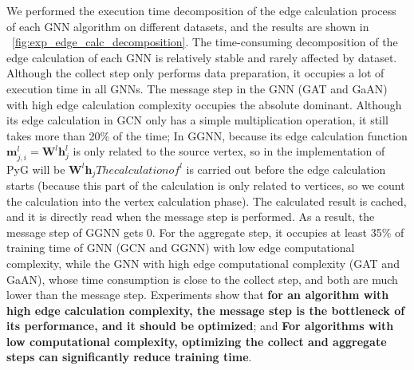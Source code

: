 We performed the execution time decomposition of the edge calculation process of each GNN algorithm on different datasets,
and the results are shown in \figurename~\ref{fig:exp_edge_calc_decomposition}.
The time-consuming decomposition of the edge calculation of each GNN is relatively stable and rarely affected by dataset.
Although the collect step only performs data preparation, it occupies a lot of execution time in all GNNs.
The message step in the GNN (GAT and GaAN) with high edge calculation complexity occupies the absolute dominant.
Although its edge calculation in GCN only has a simple multiplication operation, it still takes more than 20\% of the time;
In GGNN, because its edge calculation function $\boldsymbol{m}_{j,i }^l=\boldsymbol{W}^l\boldsymbol{h}_{j}^l$ is only related to the source vertex,
so in the implementation of PyG will be $\boldsymbol{W}^l\boldsymbol{h}_j The calculation of ^l$ is carried out before the edge calculation starts
(because this part of the calculation is only related to vertices, so we count the calculation into the vertex calculation phase).
The calculated result is cached, and it is directly read when the message step is performed. As a result, the message step of GGNN gets 0.
For the aggregate step, it occupies at least 35\% of training time of GNN (GCN and GGNN) with low edge computational complexity,
while the GNN with high edge computational complexity (GAT and GaAN), whose time consumption is close to the collect step,
and both are much lower than the message step. Experiments show that \textbf{for an algorithm with high edge calculation complexity,
    the message step is the bottleneck of its performance, and it should be optimized}; and \textbf{For algorithms with low computational complexity,
    optimizing the collect and aggregate steps can significantly reduce training time}.

